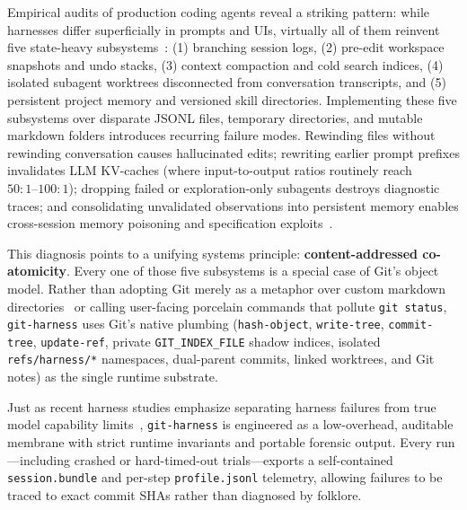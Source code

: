 \documentclass[11pt]{article}
\begin{document}
Empirical audits of production coding agents reveal a striking pattern: while harnesses differ superficially in prompts and UIs, virtually all of them reinvent five state-heavy subsystems~\citep{barbaste2026harness}:
(1) branching session logs,
(2) pre-edit workspace snapshots and undo stacks,
(3) context compaction and cold search indices,
(4) isolated subagent worktrees disconnected from conversation transcripts, and
(5) persistent project memory and versioned skill directories.
Implementing these five subsystems over disparate JSONL files, temporary directories, and mutable markdown folders introduces recurring failure modes.
Rewinding files without rewinding conversation causes hallucinated edits; rewriting earlier prompt prefixes invalidates LLM KV-caches (where input-to-output ratios routinely reach $50{:}1\text{--}100{:}1$); dropping failed or exploration-only subagents destroys diagnostic traces; and consolidating unvalidated observations into persistent memory enables cross-session memory poisoning and specification exploits~\citep{karten2026primeagent}.

This diagnosis points to a unifying systems principle: \textbf{content-addressed co-atomicity}.
Every one of those five subsystems is a special case of Git's object model.
Rather than adopting Git merely as a metaphor over custom markdown directories~\citep{wu2025gcc} or calling user-facing porcelain commands that pollute \texttt{git status}, \texttt{git-harness} uses Git's native plumbing (\texttt{hash-object}, \texttt{write-tree}, \texttt{commit-tree}, \texttt{update-ref}, private \texttt{GIT\_INDEX\_FILE} shadow indices, isolated \texttt{refs/harness/*} namespaces, dual-parent commits, linked worktrees, and Git notes) as the single runtime substrate.

Just as recent harness studies emphasize separating harness failures from true model capability limits~\citep{sghaier2026dontblame,zhang2026disclose,karten2026primeagent}, \texttt{git-harness} is engineered as a low-overhead, auditable membrane with strict runtime invariants and portable forensic output.
Every run---including crashed or hard-timed-out trials---exports a self-contained \texttt{session.bundle} and per-step \texttt{profile.jsonl} telemetry, allowing failures to be traced to exact commit SHAs rather than diagnosed by folklore.
\end{document}
